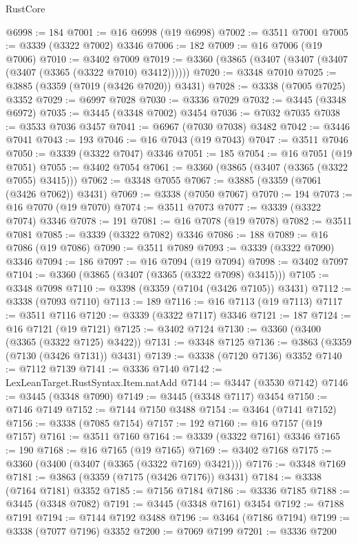 \begin{lexlean}{RustCore}
\begin{coremodule}
@6998 := 184
@7001 := @16 @6998 (@19 @6998)
@7002 := @3511 @7001
@7005 := @3339 (@3322 @7002) @3346
@7006 := 182
@7009 := @16 @7006 (@19 @7006)
@7010 := @3402 @7009
@7019 := @3360 (@3865 (@3407 (@3407 (@3407 (@3407 (@3365 (@3322 @7010) @3412))))))
@7020 := @3348 @7010
@7025 := @3885 (@3359 (@7019 (@3426 @7020)) @3431)
@7028 := @3338 (@7005 @7025) @3352
@7029 := @6997 @7028
@7030 := @3336 @7029
@7032 := @3445 (@3348 @6972)
@7035 := @3445 (@3348 @7002) @3454
@7036 := @7032 @7035
@7038 := @3533 @7036 @3457
@7041 := @6967 (@7030 @7038) @3482
@7042 := @3446 @7041
@7043 := 193
@7046 := @16 @7043 (@19 @7043)
@7047 := @3511 @7046
@7050 := @3339 (@3322 @7047) @3346
@7051 := 185
@7054 := @16 @7051 (@19 @7051)
@7055 := @3402 @7054
@7061 := @3360 (@3865 (@3407 (@3365 (@3322 @7055) @3415)))
@7062 := @3348 @7055
@7067 := @3885 (@3359 (@7061 (@3426 @7062)) @3431)
@7069 := @3338 (@7050 @7067)
@7070 := 194
@7073 := @16 @7070 (@19 @7070)
@7074 := @3511 @7073
@7077 := @3339 (@3322 @7074) @3346
@7078 := 191
@7081 := @16 @7078 (@19 @7078)
@7082 := @3511 @7081
@7085 := @3339 (@3322 @7082) @3346
@7086 := 188
@7089 := @16 @7086 (@19 @7086)
@7090 := @3511 @7089
@7093 := @3339 (@3322 @7090) @3346
@7094 := 186
@7097 := @16 @7094 (@19 @7094)
@7098 := @3402 @7097
@7104 := @3360 (@3865 (@3407 (@3365 (@3322 @7098) @3415)))
@7105 := @3348 @7098
@7110 := @3398 (@3359 (@7104 (@3426 @7105)) @3431)
@7112 := @3338 (@7093 @7110)
@7113 := 189
@7116 := @16 @7113 (@19 @7113)
@7117 := @3511 @7116
@7120 := @3339 (@3322 @7117) @3346
@7121 := 187
@7124 := @16 @7121 (@19 @7121)
@7125 := @3402 @7124
@7130 := @3360 (@3400 (@3365 (@3322 @7125) @3422))
@7131 := @3348 @7125
@7136 := @3863 (@3359 (@7130 (@3426 @7131)) @3431)
@7139 := @3338 (@7120 @7136) @3352
@7140 := @7112 @7139
@7141 := @3336 @7140
@7142 := LexLeanTarget.RustSyntax.Item.natAdd
@7144 := @3447 (@3530 @7142)
@7146 := @3445 (@3348 @7090)
@7149 := @3445 (@3348 @7117) @3454
@7150 := @7146 @7149
@7152 := @7144 @7150 @3488
@7154 := @3464 (@7141 @7152)
@7156 := @3338 (@7085 @7154)
@7157 := 192
@7160 := @16 @7157 (@19 @7157)
@7161 := @3511 @7160
@7164 := @3339 (@3322 @7161) @3346
@7165 := 190
@7168 := @16 @7165 (@19 @7165)
@7169 := @3402 @7168
@7175 := @3360 (@3400 (@3407 (@3365 (@3322 @7169) @3421)))
@7176 := @3348 @7169
@7181 := @3863 (@3359 (@7175 (@3426 @7176)) @3431)
@7184 := @3338 (@7164 @7181) @3352
@7185 := @7156 @7184
@7186 := @3336 @7185
@7188 := @3445 (@3348 @7082)
@7191 := @3445 (@3348 @7161) @3454
@7192 := @7188 @7191
@7194 := @7144 @7192 @3488
@7196 := @3464 (@7186 @7194)
@7199 := @3338 (@7077 @7196) @3352
@7200 := @7069 @7199
@7201 := @3336 @7200

\end{coremodule}
\end{lexlean}
